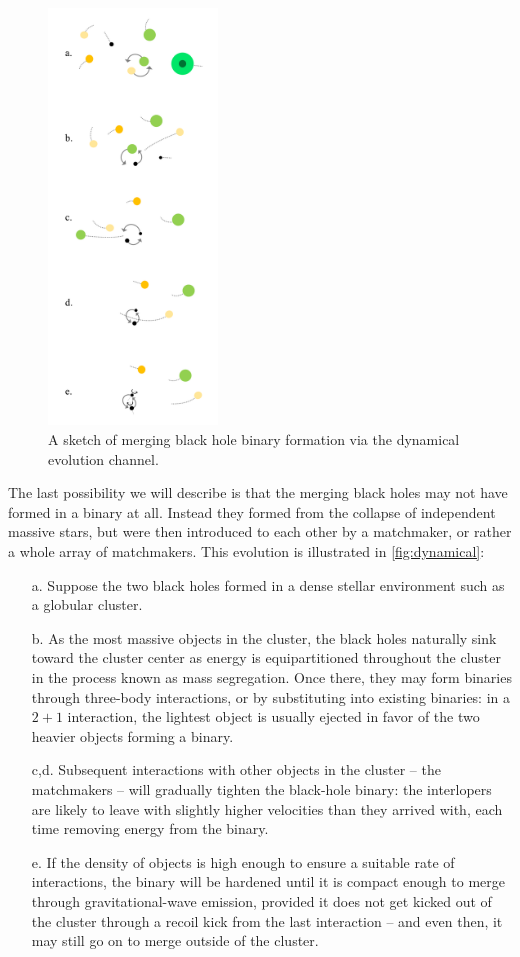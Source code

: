 \documentclass[iop,onecolumn]{revtex4}
\begin{document}
\begin{figure}
	\centering
	\includegraphics[width=0.4\textwidth]{channel3.png}
	\caption{\label{fig:dynamical} A sketch of merging black hole binary formation via the dynamical evolution channel.}
\end{figure}

The last possibility we will describe is that the merging black holes may not have formed in a binary at all.  Instead they formed from the collapse of independent massive stars, but were then introduced to each other by a matchmaker, or rather a whole array of matchmakers.   This evolution is illustrated in \autoref{fig:dynamical}: 
\begin{enumerate}
\item[a.] Suppose the two black holes formed in a dense stellar environment such as a globular cluster.  
\item[b.] As the most massive objects in the cluster, the black holes naturally sink toward the cluster center as energy is equipartitioned throughout the cluster in the process known as mass segregation.  Once there, they may form binaries through three-body interactions, or by substituting into existing binaries: in a $2+1$ interaction, the lightest object is usually ejected in favor of the two heavier objects forming a binary.  
\item[c,d.] Subsequent interactions with other objects in the cluster -- the matchmakers -- will gradually tighten the black-hole binary: the interlopers are likely to leave with  slightly higher velocities than they arrived with, each time removing energy from the binary.   
\item[e.] If the density of objects is high enough to ensure a suitable rate of interactions, the binary will be hardened until it is compact enough to merge through gravitational-wave emission, provided it does not get kicked out of the cluster through a recoil kick from the last interaction -- and even then, it may still go on to merge outside of the cluster.  
\end{enumerate}
\end{document}
